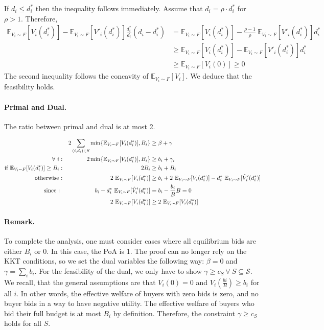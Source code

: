 If $d_{i} \leq d^{*}_{i}$ then the inequality follows immediately. Assume that $d_{i} = \rho \cdot d^{*}_{i}$ for $\rho > 1$.
Therefore,
\begin{align*}
	\mathbb{E}_{V_i \sim F}[V_{i}(d^{*}_{i})]  - \mathbb{E}_{V_i \sim F}[V'_{i}(d^{*}_{i})] \frac{d^{*}_{i}}{d_{i}} (d_{i} - d^{*}_{i})
&= \mathbb{E}_{V_i \sim F}[V_{i}(d^{*}_{i})]  - \frac{\rho - 1}{\rho}\  \mathbb{E}_{V_i \sim F}[V'_{i}(d^{*}_{i})] d^{*}_{i} \\
%
&\geq \mathbb{E}_{V_i \sim F}[V_{i}(d^{*}_{i})]  - \mathbb{E}_{V_i \sim F}[V'_{i}(d^{*}_{i})] d^{*}_{i} \\
%
&\geq \mathbb{E}_{V_i \sim F}[V_{i}(0)] \geq 0
\end{align*}
The second inequality follows the concavity of $\mathbb{E}_{V_i \sim F}[V_{i}]$. We deduce that the feasibility holds.

\paragraph{Primal and Dual.}
The ratio between primal and dual is at most 2.

\begin{align*}
	&& 2\sum_{(i,d_{i}) \in S} \min\{\mathbb{E}_{V_i \sim F}[V_i(d_i^*)], B_i \} &\ge \beta + \gamma\\
	\forall\ i : && 2 \min\{\mathbb{E}_{V_i \sim F}[V_i(d_i^*)], B_i \} &\ge b_i + \gamma_i \\
	\textnormal{if } \mathbb{E}_{V_i \sim F}[V_i(d_i^*)] \ge B_i : && 2B_i &\ge b_i + B_i\\
	\textnormal{otherwise :} && 2 \ \mathbb{E}_{V_i \sim F}[V_i(d_i^*)] &\ge b_i + 2\ \mathbb{E}_{V_i \sim F}[V_{i}(d^{*}_{i})] - d^{*}_{i}\  \mathbb{E}_{V_i \sim F}[\hat{V}'_{i}(d^{*}_{i})]\\
	\textnormal{since : } && b_i - d^{*}_{i} \ \mathbb{E}_{V_i \sim F}[\hat{V}'_{i}(d^{*}_{i})] &= b_i - \frac{b_i}{B} B = 0\\
	&& 2\  \mathbb{E}_{V_i \sim F}[V_{i}(d^{*}_{i})] &\ge 2\  \mathbb{E}_{V_i \sim F}[V_{i}(d^{*}_{i})]
\end{align*}

\paragraph{Remark.} To complete the analysis, one must consider cases where all equilibrium bids are either $B_{i}$ or 0. In this case, the PoA is 1. The proof can no longer rely on the KKT conditions, so we set the dual variables the following way:
$\beta = 0$ and $\gamma = \sum_{i} b_i$. For the feasibility of the dual, we only have to show $\gamma \ge c_S \ \forall \ S \subseteq \mathcal{S}$. We recall, that the general assumptions are that $V_i(0) = 0$ and $V_i(\frac{bi}{B}) \ge b_i$ for all $i$. In other words, the effective welfare of buyers with zero bids is zero, and no buyer bids in a way to have negative utility. The effective welfare of buyers who bid their full budget is at most $B_i$ by definition. Therefore, the constraint $\gamma \ge c_S$ holds for all $S$.

